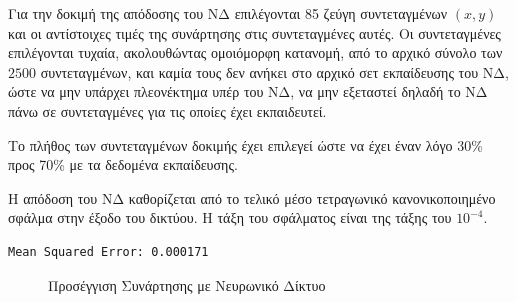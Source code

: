 \documentclass[11pt]{article}
\begin{document}
Για την δοκιμή της απόδοσης του ΝΔ επιλέγονται 85 ζεύγη συντεταγμένων $(x, y)$ και οι αντίστοιχες τιμές της συνάρτησης στις συντεταγμένες αυτές. Οι συντεταγμένες επιλέγονται τυχαία, ακολουθώντας ομοιόμορφη κατανομή, από το αρχικό σύνολο των $2500$ συντεταγμένων, και καμία τους δεν ανήκει στο αρχικό σετ εκπαίδευσης του ΝΔ, ώστε να μην υπάρχει πλεονέκτημα υπέρ του ΝΔ, να μην εξεταστεί δηλαδή το ΝΔ πάνω σε συντεταγμένες για τις οποίες έχει εκπαιδευτεί.

Το πλήθος των συντεταγμένων δοκιμής έχει επιλεγεί ώστε να έχει έναν λόγο 30\% προς 70\% με τα δεδομένα εκπαίδευσης.

Η απόδοση του ΝΔ καθορίζεται από το τελικό μέσο τετραγωνικό κανονικοποιημένο σφάλμα στην έξοδο του δικτύου. Η τάξη του σφάλματος είναι της τάξης του $10^{-4}$.

\begin{lstlisting}
Mean Squared Error: 0.000171
\end{lstlisting}

\begin{figure}[H]
\caption{Προσέγγιση Συνάρτησης με Νευρωνικό Δίκτυο}
\end{figure}
\end{document}
